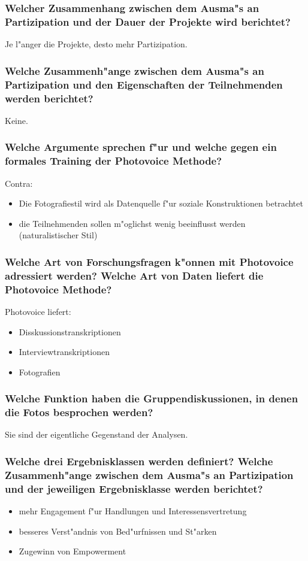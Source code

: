 \subsubsection{Welcher Zusammenhang zwischen dem Ausma"s an Partizipation und der Dauer der Projekte wird berichtet?}
Je l"anger die Projekte, desto mehr Partizipation.

\subsubsection{Welche Zusammenh"ange zwischen dem Ausma"s an Partizipation und den Eigenschaften der Teilnehmenden werden berichtet?}
Keine.

\subsubsection{Welche Argumente sprechen f"ur und welche gegen ein formales Training der Photovoice Methode?}
Contra:
\begin{itemize}
        \item Die Fotografiestil wird als Datenquelle f"ur soziale Konstruktionen betrachtet
        \item die Teilnehmenden sollen m"oglichst wenig beeinflusst werden (naturalistischer Stil)
\end{itemize}

\subsubsection{Welche Art von Forschungsfragen k"onnen mit Photovoice adressiert werden? Welche Art von Daten liefert die Photovoice Methode?}
Photovoice liefert:
\begin{itemize}
        \item Disskussionstranskriptionen
        \item Interviewtranskriptionen
        \item Fotografien
\end{itemize}

\subsubsection{Welche Funktion haben die Gruppendiskussionen, in denen die Fotos besprochen werden?}
Sie sind der eigentliche Gegenstand der Analysen.

\subsubsection{Welche drei Ergebnisklassen werden definiert? Welche Zusammenh"ange zwischen dem Ausma"s an Partizipation und der jeweiligen Ergebnisklasse werden berichtet?}
\begin{itemize}
        \item mehr Engagement f"ur Handlungen und Interessensvertretung
        \item besseres Verst"andnis von Bed"urfnissen und St"arken
        \item Zugewinn von Empowerment
\end{itemize}

